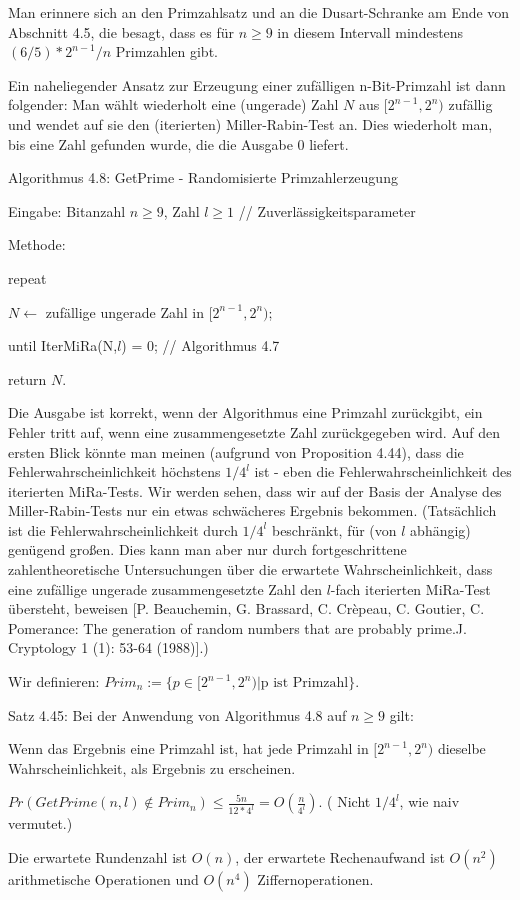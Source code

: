 \documentclass[a4paper]{article}
\begin{document}
\begin{multicols}{3}
        Man erinnere sich an den Primzahlsatz und an die Dusart-Schranke am Ende von Abschnitt 4.5, die besagt, dass es für $n\geq 9$ in diesem Intervall mindestens $(6/5)*
    2^{n-1}/n$ Primzahlen gibt.

        Ein naheliegender Ansatz zur Erzeugung einer zufälligen n-Bit-Primzahl ist dann folgender: Man wählt wiederholt eine (ungerade) Zahl $N$ aus $[2^{n-1}, 2^n)$ zufällig und wendet auf sie den (iterierten) Miller-Rabin-Test an. Dies wiederholt man, bis eine Zahl gefunden wurde, die die Ausgabe $0$ liefert.

        Algorithmus 4.8: GetPrime - Randomisierte Primzahlerzeugung
        \begin{itemize*}
            \item Eingabe: Bitanzahl $n\geq 9$, Zahl $l\geq 1$ // Zuverlässigkeitsparameter
            \item Methode:
            \item repeat
            \item $N\leftarrow$ zufällige ungerade Zahl in $[2^{n-1}, 2^n)$;
            \item until IterMiRa(N,$l$) = 0; // Algorithmus 4.7
            \item return $N$.
        \end{itemize*}

        Die Ausgabe ist korrekt, wenn der Algorithmus eine Primzahl zurückgibt, ein Fehler tritt auf, wenn eine zusammengesetzte Zahl zurückgegeben wird. Auf den ersten Blick könnte man meinen (aufgrund von Proposition 4.44), dass die Fehlerwahrscheinlichkeit höchstens $1/4^l$ ist - eben die Fehlerwahrscheinlichkeit des iterierten MiRa-Tests. Wir werden sehen, dass wir auf der Basis der Analyse des Miller-Rabin-Tests nur ein etwas schwächeres Ergebnis bekommen. (Tatsächlich ist die Fehlerwahrscheinlichkeit durch $1/4^l$ beschränkt, für (von $l$ abhängig) genügend großen. Dies kann man aber nur durch fortgeschrittene zahlentheoretische Untersuchungen über die erwartete Wahrscheinlichkeit, dass eine zufällige ungerade zusammengesetzte Zahl den $l$-fach iterierten MiRa-Test übersteht, beweisen [P. Beauchemin, G. Brassard, C. Crèpeau, C. Goutier, C. Pomerance: The generation of random numbers that are probably prime.J. Cryptology 1 (1): 53-64 (1988)].)

        Wir definieren: $Prim_n:=\{p\in [2^{n-1}, 2^n)| \text{p ist Primzahl}\}$.

        Satz 4.45: Bei der Anwendung von Algorithmus 4.8 auf $n\geq 9$ gilt:
        \begin{enumerate*}
            \item Wenn das Ergebnis eine Primzahl ist, hat jede Primzahl in $[2^{n-1}, 2^n)$ dieselbe Wahrscheinlichkeit, als Ergebnis zu erscheinen.
            \item $Pr(GetPrime(n,l)\not\in Prim_n)\leq \frac{5n}{12*4^l}=O(\frac{n}{4^l})$. ( Nicht $1/4^l$, wie naiv vermutet.)
            \item Die erwartete Rundenzahl ist $O(n)$, der erwartete Rechenaufwand ist $O(n^2)$ arithmetische Operationen und $O(n^4)$ Ziffernoperationen.
        \end{enumerate*}


\end{multicols}
\end{document}
